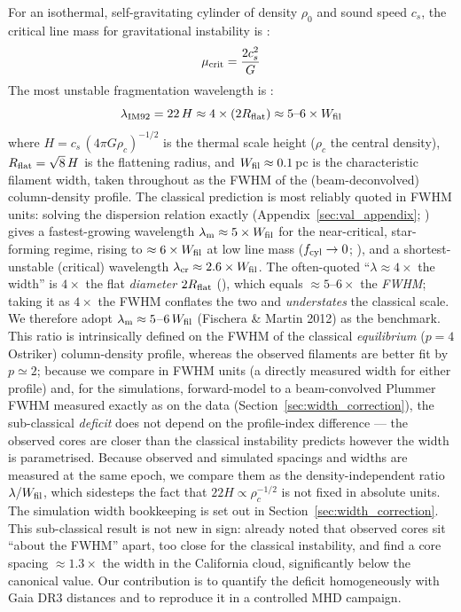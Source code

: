 \documentclass[usenatbib,twoside,twocolumn]{mnras}
\begin{document}
For an isothermal, self-gravitating cylinder of density $\rho_0$ and sound speed $c_s$, the critical line mass for gravitational instability is \citep{Ostriker1964}:
\begin{equation}
\mu_{\rm crit} = \frac{2c_s^2}{G}
\end{equation}
The most unstable fragmentation wavelength is \citep{Inutsuka1992}:
\begin{equation}
\lambda_{\rm IM92} = 22\,H \approx 4\times(2R_{\rm flat}) \approx 5\text{--}6\times W_{\rm fil}
\label{eq:im92}
\end{equation}
where $H = c_s\,(4\pi G\rho_c)^{-1/2}$ is the thermal scale height ($\rho_c$ the central density), $R_{\rm flat}=\sqrt8\,H$ is the flattening radius, and $W_{\rm fil}\approx0.1$\,pc is the characteristic filament width, taken throughout as the FWHM of the (beam-deconvolved) column-density profile. The classical prediction is most reliably quoted in FWHM units: solving the dispersion relation exactly (Appendix~\ref{sec:val_appendix}; \citealt{Fischera2012}) gives a fastest-growing wavelength $\lambda_{\rm m}\approx5\times W_{\rm fil}$ for the near-critical, star-forming regime, rising to $\approx6\times W_{\rm fil}$ at low line mass ($f_{\rm cyl}\to0$; \citealt{Fischera2012}), and a shortest-unstable (critical) wavelength $\lambda_{\rm cr}\approx2.6\times W_{\rm fil}$. The often-quoted ``$\lambda\approx4\times$ the width'' is $4\times$ the flat \emph{diameter} $2R_{\rm flat}$ (\citealt{Inutsuka1992}), which equals $\approx5$--$6\times$ the \emph{FWHM}; taking it as $4\times$ the FWHM conflates the two and \emph{understates} the classical scale. We therefore adopt $\lambda_{\rm m}\approx5$--$6\,W_{\rm fil}$ (Fischera \& Martin 2012) as the benchmark. This ratio is intrinsically defined on the FWHM of the classical \emph{equilibrium} ($p=4$ Ostriker) column-density profile, whereas the observed filaments are better fit by $p\simeq2$; because we compare in FWHM units (a directly measured width for either profile) and, for the simulations, forward-model to a beam-convolved Plummer FWHM measured exactly as on the data (Section~\ref{sec:width_correction}), the sub-classical \emph{deficit} does not depend on the profile-index difference --- the observed cores are closer than the classical instability predicts however the width is parametrised. Because observed and simulated spacings and widths are measured at the same epoch, we compare them as the density-independent ratio $\lambda/W_{\rm fil}$, which sidesteps the fact that $22H\propto\rho_c^{-1/2}$ is not fixed in absolute units. The simulation width bookkeeping is set out in Section~\ref{sec:width_correction}. This sub-classical result is not new in sign: \citet{Fischera2012} already noted that observed cores sit ``about the FWHM'' apart, too close for the classical instability, and \citet{Zhang2023cal} find a core spacing $\approx1.3\times$ the width in the California cloud, significantly below the canonical value. Our contribution is to quantify the deficit homogeneously with Gaia DR3 distances and to reproduce it in a controlled MHD campaign.
\end{document}
